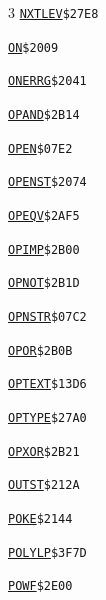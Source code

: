 \begin{multicols}{3}
\noindent\hyperlink{l:NXTLEV}{\texttt{NXTLEV}}\hfill\texttt{\$27E8~\phantom{000}\llap{\pageref{l:NXTLEV}}}\par
\noindent\hyperlink{l:ON}{\texttt{ON}}\hfill\texttt{\$2009~\phantom{000}\llap{\pageref{l:ON}}}\par
\noindent\hyperlink{l:ONERRG}{\texttt{ONERRG}}\hfill\texttt{\$2041~\phantom{000}\llap{\pageref{l:ONERRG}}}\par
\noindent\hyperlink{l:OPAND}{\texttt{OPAND}}\hfill\texttt{\$2B14~\phantom{000}\llap{\pageref{l:OPAND}}}\par
\noindent\hyperlink{l:OPEN}{\texttt{OPEN}}\hfill\texttt{\$07E2~\phantom{000}\llap{\pageref{l:OPEN}}}\par
\noindent\hyperlink{l:OPENST}{\texttt{OPENST}}\hfill\texttt{\$2074~\phantom{000}\llap{\pageref{l:OPENST}}}\par
\noindent\hyperlink{l:OPEQV}{\texttt{OPEQV}}\hfill\texttt{\$2AF5~\phantom{000}\llap{\pageref{l:OPEQV}}}\par
\noindent\hyperlink{l:OPIMP}{\texttt{OPIMP}}\hfill\texttt{\$2B00~\phantom{000}\llap{\pageref{l:OPIMP}}}\par
\noindent\hyperlink{l:OPNOT}{\texttt{OPNOT}}\hfill\texttt{\$2B1D~\phantom{000}\llap{\pageref{l:OPNOT}}}\par
\noindent\hyperlink{l:OPNSTR}{\texttt{OPNSTR}}\hfill\texttt{\$07C2~\phantom{000}\llap{\pageref{l:OPNSTR}}}\par
\noindent\hyperlink{l:OPOR}{\texttt{OPOR}}\hfill\texttt{\$2B0B~\phantom{000}\llap{\pageref{l:OPOR}}}\par
\noindent\hyperlink{l:OPTEXT}{\texttt{OPTEXT}}\hfill\texttt{\$13D6~\phantom{000}\llap{\pageref{l:OPTEXT}}}\par
\noindent\hyperlink{l:OPTYPE}{\texttt{OPTYPE}}\hfill\texttt{\$27A0~\phantom{000}\llap{\pageref{l:OPTYPE}}}\par
\noindent\hyperlink{l:OPXOR}{\texttt{OPXOR}}\hfill\texttt{\$2B21~\phantom{000}\llap{\pageref{l:OPXOR}}}\par
\noindent\hyperlink{l:OUTST}{\texttt{OUTST}}\hfill\texttt{\$212A~\phantom{000}\llap{\pageref{l:OUTST}}}\par
\noindent\hyperlink{l:POKE}{\texttt{POKE}}\hfill\texttt{\$2144~\phantom{000}\llap{\pageref{l:POKE}}}\par
\noindent\hyperlink{l:POLYLP}{\texttt{POLYLP}}\hfill\texttt{\$3F7D~\phantom{000}\llap{\pageref{l:POLYLP}}}\par
\noindent\hyperlink{l:POWF}{\texttt{POWF}}\hfill\texttt{\$2E00~\phantom{000}\llap{\pageref{l:POWF}}}\par

\end{multicols}
